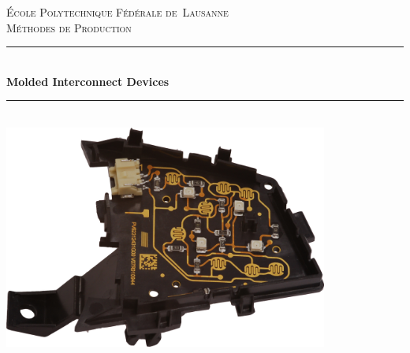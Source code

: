 \begin{titlepage}

\newcommand{\HRule}{\rule{\linewidth}{0.5mm}} %

\center %
\textsc{\LARGE École Polytechnique Fédérale de~Lausanne}\\[1.5cm] 
\textsc{\Large Méthodes de Production}\\[0.5cm] %

\HRule \\[0.4cm]
{ \huge \bfseries Molded Interconnect Devices}\\[0.4cm] %
\HRule \\[1.5cm]
 
\includegraphics[width=0.8\textwidth]{images/mid_example}\\[2cm] 



\end{titlepage}
